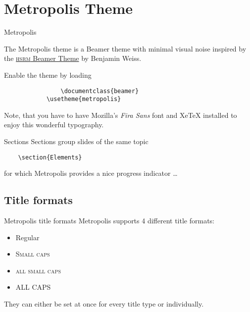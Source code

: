 \section{Metropolis Theme}
		
		\begin{frame}[fragile]{Metropolis}
		
		  The Metropolis theme is a Beamer theme with minimal visual noise
		  inspired by the \href{https://github.com/hsrmbeamertheme/hsrmbeamertheme}{\textsc{hsrm} Beamer
		  Theme} by Benjamin Weiss.
		
		  Enable the theme by loading
		
		  \begin{verbatim}    
		  		\documentclass{beamer}
		   	\usetheme{metropolis}
		   \end{verbatim}
		
		  Note, that you have to have Mozilla's \emph{Fira Sans} font and XeTeX
		  installed to enjoy this wonderful typography.
		\end{frame}
		
		\begin{frame}[fragile]{Sections}
		  Sections group slides of the same topic
		
		  \begin{verbatim}    \section{Elements}\end{verbatim}
		
		  for which Metropolis provides a nice progress indicator \ldots
		\end{frame}
	
	\subsection{Title formats}
	
		\begin{frame}{Metropolis title formats}
			Metropolis supports 4 different title formats:
			\begin{itemize}
				\item Regular
				\item \textsc{Small caps}
				\item \textsc{all small caps}
				\item ALL CAPS
			\end{itemize}
			They can either be set at once for every title type or individually.
		\end{frame}
		
